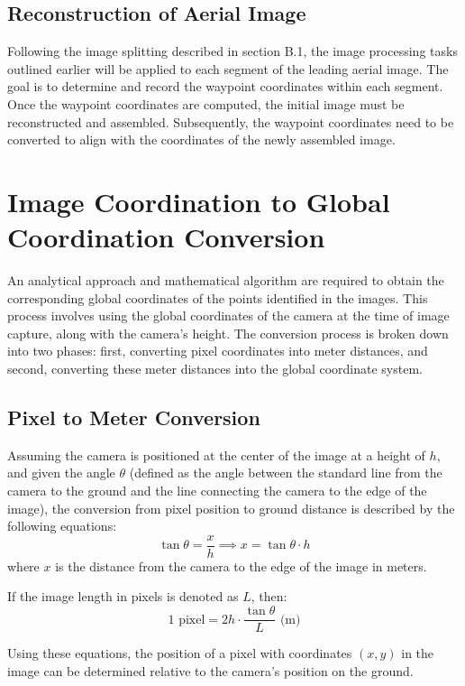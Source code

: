 \documentclass[conference]{IEEEtran}
\begin{document}
\subsection{Reconstruction of Aerial Image}\label{Reconstruction of Aerial Image}
Following the image splitting described in section B.1, the image processing tasks outlined earlier will be applied to each segment of the leading aerial image. The goal is to determine and record the waypoint coordinates within each segment. Once the waypoint coordinates are computed, the initial image must be reconstructed and assembled. Subsequently, the waypoint coordinates need to be converted to align with the coordinates of the newly assembled image.

\section{Image Coordination to Global Coordination Conversion}\label{Image Coordination to Global Coordination Conversion}
An analytical approach and mathematical algorithm are required to obtain the corresponding global coordinates of the points identified in the images. This process involves using the global coordinates of the camera at the time of image capture, along with the camera's height. The conversion process is broken down into two phases: first, converting pixel coordinates into meter distances, and second, converting these meter distances into the global coordinate system.

\subsection{Pixel to Meter Conversion}\label{Pixel to Meter Conversion}
Assuming the camera is positioned at the center of the image at a height of \( h \), and given the angle \( \theta \) (defined as the angle between the standard line from the camera to the ground and the line connecting the camera to the edge of the image), the conversion from pixel position to ground distance is described by the following equations:
\[
\tan \theta = \frac{x}{h} \implies x = \tan \theta  \cdot h
\]
where \( x \) is the distance from the camera to the edge of the image in meters.

If the image length in pixels is denoted as \( L \), then:
\[
1 \text{ pixel} = 2h \cdot \frac{\tan \theta}{L} \text{ (m)}
\]

Using these equations, the position of a pixel with coordinates \((x, y)\) in the image can be determined relative to the camera's position on the ground.
\end{document}
